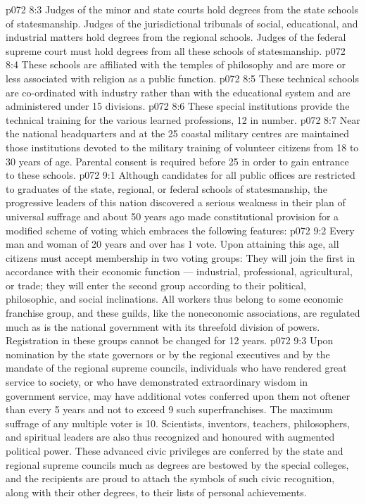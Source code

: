 \vs p072 8:3 Judges of the minor and state courts hold degrees from the state schools of statesmanship. Judges of the jurisdictional tribunals of social, educational, and industrial matters hold degrees from the regional schools. Judges of the federal supreme court must hold degrees from all these schools of statesmanship.
\vs p072 8:4 \bibnobreakspace {} These schools are affiliated with the temples of philosophy and are more or less associated with religion as a public function.
\vs p072 8:5 \bibnobreakspace {} These technical schools are co\hyp{}ordinated with industry rather than with the educational system and are administered under 15 divisions.
\vs p072 8:6 \bibnobreakspace {} These special institutions provide the technical training for the various learned professions, 12 in number.
\vs p072 8:7 \bibnobreakspace {} Near the national headquarters and at the 25 coastal military centres are maintained those institutions devoted to the military training of volunteer citizens from 18 to 30 years of age. Parental consent is required before 25 in order to gain entrance to these schools.
\vs p072 9:1 Although candidates for all public offices are restricted to graduates of the state, regional, or federal schools of statesmanship, the progressive leaders of this nation discovered a serious weakness in their plan of universal suffrage and about 50 years ago made constitutional provision for a modified scheme of voting which embraces the following features:
\vs p072 9:2 \bibnobreakspace Every man and woman of 20 years and over has 1 vote. Upon attaining this age, all citizens must accept membership in two voting groups: They will join the first in accordance with their economic function --- industrial, professional, agricultural, or trade; they will enter the second group according to their political, philosophic, and social inclinations. All workers thus belong to some economic franchise group, and these guilds, like the noneconomic associations, are regulated much as is the national government with its threefold division of powers. Registration in these groups cannot be changed for 12 years.
\vs p072 9:3 \bibnobreakspace Upon nomination by the state governors or by the regional executives and by the mandate of the regional supreme councils, individuals who have rendered great service to society, or who have demonstrated extraordinary wisdom in government service, may have additional votes conferred upon them not oftener than every 5 years and not to exceed 9 such superfranchises. The maximum suffrage of any multiple voter is 10. Scientists, inventors, teachers, philosophers, and spiritual leaders are also thus recognized and honoured with augmented political power. These advanced civic privileges are conferred by the state and regional supreme councils much as degrees are bestowed by the special colleges, and the recipients are proud to attach the symbols of such civic recognition, along with their other degrees, to their lists of personal achievements.
